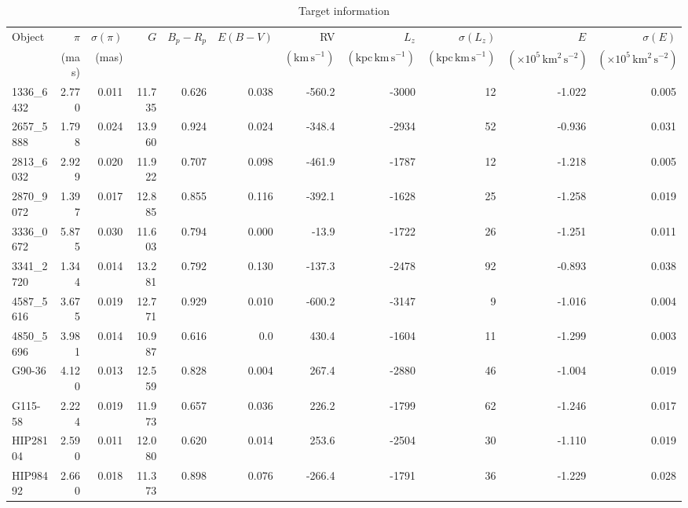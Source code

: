\documentclass{aa}
\begin{document}
\begin{table}
  \caption{Target information\label{tab:kinematics_photo}}
  \centering
  \begin{tabular}{lrrrrrrrrrr}
\hline\hline
Object & $\pi$ & $\sigma(\pi)$ & $G$ & $B_p-R_p$ & $E(B-V)$ & RV & $L_z$ & $\sigma(L_z)$ & $E$ & $\sigma(E)$ \\
& (mas) & (mas) & & &  & $(\mathrm{km\,s^{-1}})$ & $(\mathrm{kpc\,km\,s^{-1}})$ & $(\mathrm{kpc\,km\,s^{-1}})$ & $(\times 10^5\,\mathrm{km^2\,s^{-2}})$ & $(\times 10^5\,\mathrm{km^2\,s^{-2}})$ \\\hline
1336\_6432       &      2.770 &      0.011 & 11.735 &  0.626 &  0.038 & -560.2 &      -3000 &         12 &     -1.022 &      0.005 \\
2657\_5888       &      1.798 &      0.024 & 13.960 &  0.924 &  0.024 & -348.4 &      -2934 &         52 &     -0.936 &      0.031 \\
2813\_6032       &      2.929 &      0.020 & 11.922 &  0.707 &  0.098 & -461.9 &      -1787 &         12 &     -1.218 &      0.005 \\
2870\_9072       &      1.397 &      0.017 & 12.885 &  0.855 &  0.116 & -392.1 &      -1628 &         25 &     -1.258 &      0.019 \\
3336\_0672       &      5.875 &      0.030 & 11.603 &  0.794 &  0.000 &  -13.9 &      -1722 &         26 &     -1.251 &      0.011 \\
3341\_2720       &      1.344 &      0.014 & 13.281 &  0.792 &  0.130 & -137.3 &      -2478 &         92 &     -0.893 &      0.038 \\
4587\_5616       &      3.675 &      0.019 & 12.771 &  0.929 &  0.010 & -600.2 &      -3147 &          9 &     -1.016 &      0.004 \\
4850\_5696       &      3.981 &      0.014 & 10.987 &  0.616 &    0.0 &  430.4 &      -1604 &         11 &     -1.299 &      0.003 \\
G90-36          &      4.120 &      0.013 & 12.559 &  0.828 &  0.004 &  267.4 &      -2880 &         46 &     -1.004 &      0.019 \\
G115-58         &      2.224 &      0.019 & 11.973 &  0.657 &  0.036 &  226.2 &      -1799 &         62 &     -1.246 &      0.017 \\
HIP28104        &      2.590 &      0.011 & 12.080 &  0.620 &  0.014 &  253.6 &      -2504 &         30 &     -1.110 &      0.019 \\
HIP98492        &      2.660 &      0.018 & 11.373 &  0.898 &  0.076 & -266.4 &      -1791 &         36 &     -1.229 &      0.028 \\\hline

\end{tabular}
\end{table}
\end{document}
